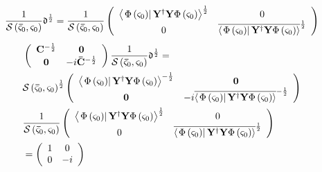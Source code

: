 \documentclass[aps,preprint]{revtex4}%
\begin{document}
\begin{equation}
\frac{1}{\mathcal{S}\left(  \mathbf{\bar{\varsigma}}_{0},\mathbf{\varsigma
}_{0}\right)  }\mathfrak{\Delta}^{\frac{1}{2}}=\frac{1}{\mathcal{S}\left(
\mathbf{\bar{\varsigma}}_{0},\mathbf{\varsigma}_{0}\right)  }\left(
\begin{array}
[c]{cc}%
\left\langle \left.  \Phi\left(  \mathbf{\varsigma}_{0}\right)  \right\vert
\mathbf{Y}^{\dagger}\mathbf{Y}\Phi\left(  \mathbf{\varsigma}_{0}\right)
\right\rangle ^{\frac{1}{2}} & 0\\
0 & \overline{\left\langle \left.  \Phi\left(  \mathbf{\varsigma}_{0}\right)
\right\vert \mathbf{Y^{\dagger}Y}\Phi\left(  \mathbf{\varsigma}_{0}\right)
\right\rangle }^{\frac{1}{2}}%
\end{array}
\right)
\end{equation}%
\begin{align}
& \left(
\begin{array}
[c]{cc}%
\mathbf{C}^{-\frac{1}{2}} & \mathbf{0}\\
\mathbf{0} & -i\mathbf{\bar{C}}^{-\frac{1}{2}}%
\end{array}
\right)  \frac{1}{\mathcal{S}\left(  \mathbf{\bar{\varsigma}}_{0}%
,\mathbf{\varsigma}_{0}\right)  }\mathfrak{\Delta}^{\frac{1}{2}}=\\
& \mathcal{S}\left(  \mathbf{\bar{\varsigma}}_{0},\mathbf{\varsigma}%
_{0}\right)  ^{\frac{1}{2}}\left(
\begin{array}
[c]{cc}%
\left\langle \left.  \Phi\left(  \mathbf{\varsigma}_{0}\right)  \right\vert
\mathbf{Y}^{\dagger}\mathbf{Y}\Phi\left(  \mathbf{\varsigma}_{0}\right)
\right\rangle ^{-\frac{1}{2}} & \mathbf{0}\\
\mathbf{0} & -i\overline{\left\langle \left.  \Phi\left(  \mathbf{\varsigma
}_{0}\right)  \right\vert \mathbf{Y}^{\dagger}\mathbf{Y}\Phi\left(
\mathbf{\varsigma}_{0}\right)  \right\rangle }^{-\frac{1}{2}}%
\end{array}
\right)  \\
& \frac{1}{\mathcal{S}\left(  \mathbf{\bar{\varsigma}}_{0},\mathbf{\varsigma
}_{0}\right)  }\left(
\begin{array}
[c]{cc}%
\left\langle \left.  \Phi\left(  \mathbf{\varsigma}_{0}\right)  \right\vert
\mathbf{Y}^{\dagger}\mathbf{Y}\Phi\left(  \mathbf{\varsigma}_{0}\right)
\right\rangle ^{\frac{1}{2}} & 0\\
0 & \overline{\left\langle \left.  \Phi\left(  \mathbf{\varsigma}_{0}\right)
\right\vert \mathbf{Y^{\dagger}Y}\Phi\left(  \mathbf{\varsigma}_{0}\right)
\right\rangle }^{\frac{1}{2}}%
\end{array}
\right)  \\
& =\left(
\begin{array}
[c]{cc}%
1 & 0\\
0 & -i
\end{array}
\right)
\end{align}%
\end{document}
